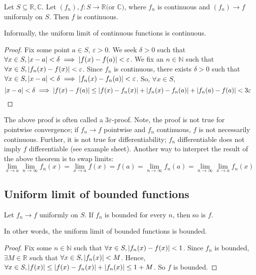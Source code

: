 \begin{theorem}
	Let \( S \subseteq \mathbb R, \mathbb C \).
	Let \( (f_n), f \colon S \to \mathbb R \text{(or } \mathbb{C} \text{)} \), where \( f_n \) is continuous and \( (f_n) \to f \) uniformly on \( S \).
	Then \( f \) is continuous.
\end{theorem}
\noindent Informally, the uniform limit of continuous functions is continuous.
\begin{proof}
	Fix some point \( a \in S \), \( \varepsilon > 0 \).
	We seek \( \delta > 0 \) such that \( \forall x \in S, \abs{x - a} < \delta \implies \abs{f(x) - f(a)} < \varepsilon \).
	We fix an \( n \in \mathbb N \) such that \( \forall x \in S, \abs{f_n(x) - f(x)} < \varepsilon \).
	Since \( f_n \) is continuous, there exists \( \delta > 0 \) such that \( \forall x \in S, \abs{x - a} < \delta \implies \abs{f_n(x) - f_n(a)} < \varepsilon \).
	So, \( \forall x \in S \),
	\[
		\abs{x - a} < \delta  \implies \abs{f(x) - f(a)} \leq \abs{f(x) - f_n(x)} + \abs{f_n(x) - f_n(a)} + \abs{f_n(a) - f(a)} < 3\varepsilon
	\]
\end{proof}
\begin{remark}
	The above proof is often called a \( 3\varepsilon \)-proof.
	Note, the proof is not true for pointwise convergence; if \( f_n \to f \) pointwise and \( f_n \) continuous, \( f \) is not necessarily continuous.
	Further, it is not true for differentiability; \( f_n \) differentiable does not imply \( f \) differentiable (see example sheet).
	Another way to interpret the result of the above theorem is to swap limits:
	\[
		\lim_{x \to a} \lim_{n \to \infty} f_n(x) = \lim_{x \to a} f(x) = f(a) = \lim_{n \to \infty} f_n(a) = \lim_{n \to \infty} \lim_{x \to a} f_n(x)
	\]
\end{remark}

\subsection{Uniform limit of bounded functions}
\begin{lemma}
	Let \( f_n \to f \) uniformly on \( S \).
	If \( f_n \) is bounded for every \( n \), then so is \( f \).
\end{lemma}
\noindent In other words, the uniform limit of bounded functions is bounded.
\begin{proof}
	Fix some \( n \in \mathbb N \) such that \( \forall x \in S, \abs{f_n(x) - f(x)} < 1 \).
	Since \( f_n \) is bounded, \( \exists M \in \mathbb R \) such that \( \forall x \in S, \abs{f_n(x)} < M \).
	Hence, \( \forall x \in S, \abs{f(x)} \leq \abs{f(x) - f_n(x)} + \abs{f_n(x)} \leq 1 + M \).
	So \( f \) is bounded.
\end{proof}

